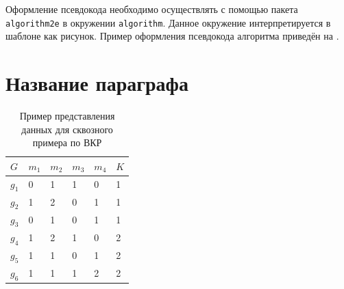 
	
Оформление псевдокода необходимо осуществлять с помощью пакета \verb|algorithm2e| в окружении \verb|algorithm|. Данное окружение интерпретируется в шаблоне как рисунок. Пример оформления псевдокода алгоритма приведён на . 
	
	

	
\section{Название параграфа} \label{ch2:sec-very-short-title} %


	


%



\begin{table} [htbp]%
	\centering\small
	\caption{Пример представления данных для сквозного примера по ВКР \cite{Peskov2004}}%
	\label{tab:ToyCompare}		
		\begin{tabular}{|l|l|l|l|l|l|}
			\hline
			$G$&$m_1$&$m_2$&$m_3$&$m_4$&$K$\\
			\hline
			$g_1$&0&1&1&0&1\\ \hline
			$g_2$&1&2&0&1&1\\ \hline
			$g_3$&0&1&0&1&1\\ \hline
			$g_4$&1&2&1&0&2\\ \hline
			$g_5$&1&1&0&1&2\\ \hline
			$g_6$&1&1&1&2&2\\ \hline		
		\end{tabular}
	\normalsize%
\end{table}



